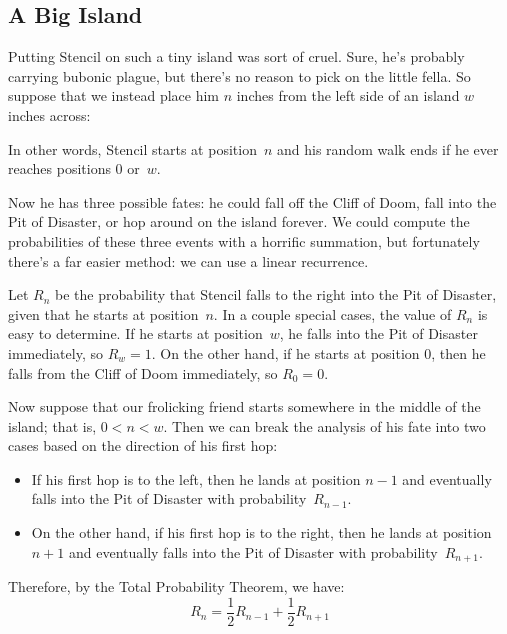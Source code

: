 \subsection{A Big Island}

Putting Stencil on such a tiny island was sort of cruel.  Sure, he's
probably carrying bubonic plague, but there's no reason to pick on the
little fella.  So suppose that we instead place him $n$ inches from
the left side of an island $w$ inches across:
%
\begin{figure}[h]


\end{figure}
%
In other words, Stencil starts at position~$n$ and his random walk
ends if he ever reaches positions 0 or~$w$.

Now he has three possible fates: he could fall off the Cliff of Doom,
fall into the Pit of Disaster, or hop around on the island forever.
We could compute the probabilities of these three events with a
horrific summation, but fortunately there's a far easier method: we
can use a linear recurrence.

Let $R_n$ be the probability that Stencil falls to the right into the
Pit of Disaster, given that he starts at position~$n$.  In a couple
special cases, the value of $R_n$ is easy to determine.  If he starts
at position~$w$, he falls into the Pit of Disaster immediately, so
$R_w = 1$.  On the other hand, if he starts at position $0$, then he
falls from the Cliff of Doom immediately, so $R_0 = 0$.

Now suppose that our frolicking friend starts somewhere in the middle
of the island; that is, $0 < n < w$.  Then we can break the analysis
of his fate into two cases based on the direction of his first hop:
%
\begin{itemize}

\item

If his first hop is to the left, then he lands at position $n-1$ and
eventually falls into the Pit of Disaster with probability~$R_{n-1}$.

\item

On the other hand, if his first hop is to the right, then he lands at
position~$n+1$ and eventually falls into the Pit of Disaster with
probability~$R_{n+1}$.

\end{itemize}
%
Therefore, by the Total Probability Theorem, we have:
%
\[
R_n = \frac{1}{2} R_{n-1} + \frac{1}{2} R_{n+1}
\]

